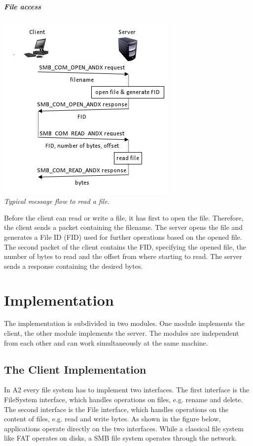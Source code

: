 \documentclass[11pt,a4paper]{book}
\begin{document}
\paragraph{File access}

\begin{center}
\includegraphics{fileaccess.png} \\
\vspace{6pt}
\textit{Typical message flow to read a file.}
\end{center}

Before the client can read or write a file, it has first to open the file. Therefore, the client sends a packet containing the filename. The server opens the file and generates a File ID (FID) used for further operations based on the opened file. The second packet of the client contains the FID, specifying the opened file, the number of bytes to read and the offset from where starting to read. The server sends a response containing the desired bytes.

\chapter{Implementation}
The implementation is subdivided in two modules. One module implements the client, the other module implements the server. The modules are independent from each other and can work simultaneously at the same machine.

\section{The Client Implementation}
In A2 every file system has to implement two interfaces. The first interface is the FileSystem interface, which handles operations on files, e.g. rename and delete. The second interface is the File interface, which handles operations on the content of files, e.g. read and write bytes. As shown in the figure below, applications operate directly on the two interfaces. While a classical file system like FAT operates on disks, a SMB file system operates through the network.
\end{document}
